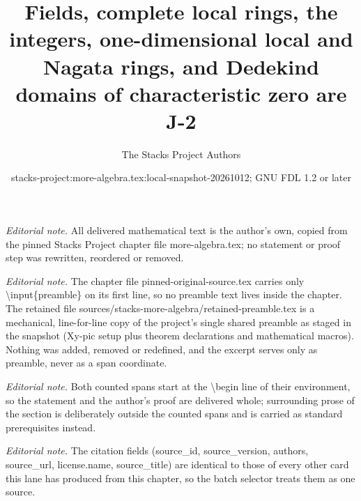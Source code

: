 \documentclass[10pt,a4paper]{amsart}
\title{Fields, complete local rings, the integers, one-dimensional local and Nagata rings, and Dedekind domains of characteristic zero are J-2}
\author{The Stacks Project Authors}
\date{stacks-project:more-algebra.tex:local-snapshot-20261012; GNU FDL 1.2 or later}
\theoremstyle{plain}
\theoremstyle{definition}
\theoremstyle{remark}
\numberwithin{equation}{subsection}
\begin{document}
\maketitle
\setcounter{subsection}{1}
\noindent\textit{Editorial note.} All delivered mathematical text is the author's own, copied from the pinned Stacks Project chapter file more-algebra.tex; no statement or proof step was rewritten, reordered or removed.\par\medskip
\noindent\textit{Editorial note.} The chapter file pinned-original-source.tex carries only \textbackslash{}input\{preamble\} on its first line, so no preamble text lives inside the chapter. The retained file sources/stacks-more-algebra/retained-preamble.tex is a mechanical, line-for-line copy of the project's single shared preamble as staged in the snapshot (Xy-pic setup plus theorem declarations and mathematical macros). Nothing was added, removed or redefined, and the excerpt serves only as preamble, never as a span coordinate.\par\medskip
\noindent\textit{Editorial note.} Both counted spans start at the \textbackslash{}begin line of their environment, so the statement and the author's proof are delivered whole; surrounding prose of the section is deliberately outside the counted spans and is carried as standard prerequisites instead.\par\medskip
\noindent\textit{Editorial note.} The citation fields (source\_id, source\_version, authors, source\_url, license.name, source\_title) are identical to those of every other card this lane has produced from this chapter, so the batch selector treats them as one source.\par\medskip
\end{document}
